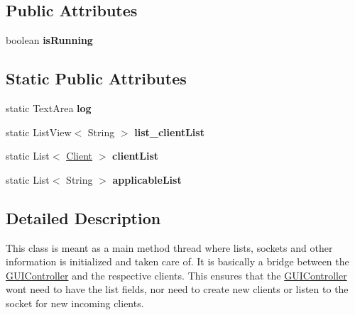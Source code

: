 \subsection*{Public Attributes}
\begin{DoxyCompactItemize}
\item 
boolean {\bfseries is\+Running}\hypertarget{classserver_1_1_kickstarter_a184746683b94fbb9b35d09597fed892e}{}\label{classserver_1_1_kickstarter_a184746683b94fbb9b35d09597fed892e}

\end{DoxyCompactItemize}
\subsection*{Static Public Attributes}
\begin{DoxyCompactItemize}
\item 
static Text\+Area {\bfseries log}\hypertarget{classserver_1_1_kickstarter_ae8a852a9e388b350610fad0f51178ab6}{}\label{classserver_1_1_kickstarter_ae8a852a9e388b350610fad0f51178ab6}

\item 
static List\+View$<$ String $>$ {\bfseries list\+\_\+client\+List}\hypertarget{classserver_1_1_kickstarter_ac9e598cda0986ee51231eb6b6bcd084f}{}\label{classserver_1_1_kickstarter_ac9e598cda0986ee51231eb6b6bcd084f}

\item 
static List$<$ \hyperlink{classserver_1_1_client}{Client} $>$ {\bfseries client\+List}\hypertarget{classserver_1_1_kickstarter_a841d1ef40496a543ee9319983884fd07}{}\label{classserver_1_1_kickstarter_a841d1ef40496a543ee9319983884fd07}

\item 
static List$<$ String $>$ {\bfseries applicable\+List}\hypertarget{classserver_1_1_kickstarter_a6ed3fe0b4d90f3de3b315bcb70ea89e1}{}\label{classserver_1_1_kickstarter_a6ed3fe0b4d90f3de3b315bcb70ea89e1}

\end{DoxyCompactItemize}


\subsection{Detailed Description}
This class is meant as a main method thread where lists, sockets and other information is initialized and taken care of. It is basically a bridge between the \hyperlink{classserver_1_1_g_u_i_controller}{G\+U\+I\+Controller} and the respective clients. This ensures that the \hyperlink{classserver_1_1_g_u_i_controller}{G\+U\+I\+Controller} won\textquotesingle{}t need to have the list fields, nor need to create new clients or listen to the socket for new incoming clients.

